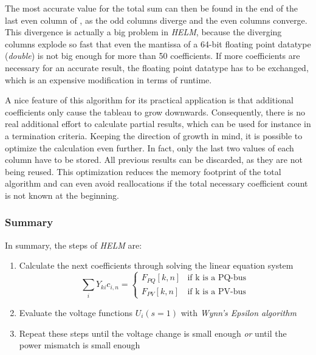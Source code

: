 The most accurate value for the total sum can then be found in the end of the last even column of , as the odd columns diverge and the even columns converge. This divergence is actually a big problem in \emph{HELM}, because the diverging columns explode so fast that even the mantissa of a 64-bit floating point datatype (\emph{double}) is not big enough for more than 50 coefficients. If more coefficients are necessary for an accurate result, the floating point datatype has to be exchanged, which is an expensive modification in terms of runtime.

A nice feature of this algorithm for its practical application is that additional coefficients only cause the tableau to grow downwards. Consequently, there is no real additional effort to calculate partial results, which can be used for instance in a termination criteria. Keeping the direction of growth in mind, it is possible to optimize the calculation even further. In fact, only the last two values of each column have to be stored. All previous results can be discarded, as they are not being reused. This optimization reduces the memory footprint of the total algorithm and can even avoid reallocations if the total necessary coefficient count is not known at the beginning.

\subsubsection{Summary}
In summary, the steps of \emph{HELM} are:
\begin{enumerate}
	\item Calculate the next coefficients through solving the linear equation system
	\begin{equation}
		\sum_i Y_{ki} c_{i,n} = 
		\begin{cases}
			F_{PQ}[k,n] & \text{if k is a PQ-bus} \\
			F_{PV}[k,n] & \text{if k is a PV-bus}
		\end{cases}
		\label{eq:helm_total_equation_system}
	\end{equation}
	\item Evaluate the voltage functions $U_i(s = 1)$ with \emph{Wynn's Epsilon algorithm}
	\item Repeat these steps until the voltage change is small enough \emph{or} until the power mismatch is small enough
\end{enumerate}

